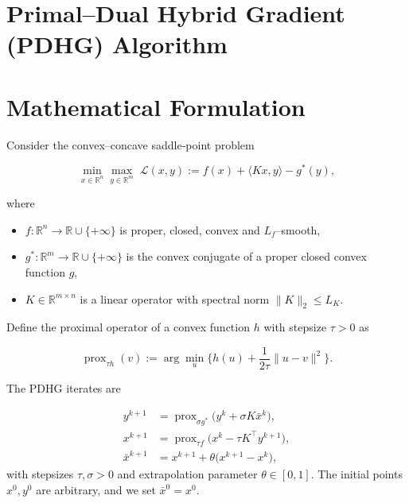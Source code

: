 \documentclass{article}
\begin{document}
\section*{Primal--Dual Hybrid Gradient (PDHG) Algorithm}

\section*{Mathematical Formulation}
Consider the convex–concave saddle‑point problem  

\[
\min_{x\in\mathbb{R}^n}\max_{y\in\mathbb{R}^m}
\; \mathcal L (x,y):= f(x)+\langle Kx ,y\rangle - g^{*}(y),
\tag{1}
\]

where  

\begin{itemize}
  \item $f:\mathbb{R}^{n}\to\mathbb{R}\cup\{+\infty\}$ is proper, closed, convex and $L_f$–smooth,
  \item $g^{*}:\mathbb{R}^{m}\to\mathbb{R}\cup\{+\infty\}$ is the convex conjugate of a proper closed convex function $g$,
  \item $K\in\mathbb{R}^{m\times n}$ is a linear operator with spectral norm $\|K\|_2\le L_K$.
\end{itemize}

Define the proximal operator of a convex function $h$ with stepsize $\tau>0$ as  

\[
\operatorname{prox}_{\tau h}(v):=\arg\min_{u}\Big\{h(u)+\frac{1}{2\tau}\|u-v\|^{2}\Big\}.
\tag{2}
\]

The PDHG iterates are  

\[
\begin{aligned}
y^{k+1}      &=\operatorname{prox}_{\sigma g^{*}}\!\Big(y^{k}+ \sigma K\bar x^{k}\Big), \tag{3a}\\
x^{k+1}      &=\operatorname{prox}_{\tau f}\!\Big(x^{k}-\tau K^{\!\top} y^{k+1}\Big), \tag{3b}\\
\bar x^{k+1} &=x^{k+1}+ \theta\big(x^{k+1}-x^{k}\big), \tag{3c}
\end{aligned}
\]
with stepsizes $\tau,\sigma>0$ and extrapolation parameter $\theta\in[0,1]$.  
The initial points $x^{0},y^{0}$ are arbitrary, and we set $\bar x^{0}=x^{0}$.
\end{document}
